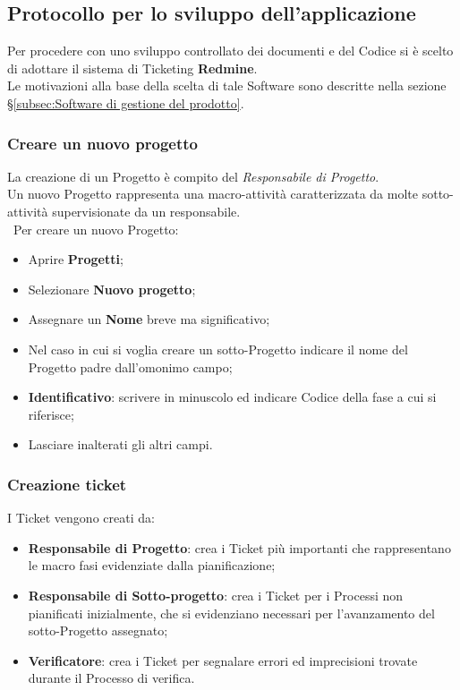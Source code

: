 \subsection{Protocollo per lo sviluppo dell'applicazione}
\label{sec:protocolloSviluppo} 
Per procedere con uno sviluppo controllato dei documenti e del Codice si è scelto di adottare il sistema di Ticketing \textbf{Redmine}.\\ 
Le motivazioni alla base della scelta di tale Software sono descritte nella sezione \S\ref{subsec:Software di gestione del prodotto}.

\subsubsection{Creare un nuovo progetto} 

La creazione di un Progetto è compito del \emph{Responsabile di Progetto}.\\ 
Un nuovo Progetto rappresenta una macro-attività caratterizzata da molte sotto-attività supervisionate da un responsabile.\\\
Per creare un nuovo Progetto:
\begin{itemize}
\item Aprire \textbf{Progetti}; 
\item Selezionare \textbf{Nuovo progetto}; 
\item Assegnare un \textbf{Nome} breve ma significativo; 
\item Nel caso in cui si voglia creare un sotto-Progetto indicare il nome del Progetto padre dall’omonimo campo; 
\item \textbf{Identificativo}: scrivere in minuscolo ed indicare Codice\ped{g} della fase a cui si riferisce;
\item Lasciare inalterati gli altri campi. 
\end{itemize}
 
\subsubsection{Creazione ticket}
 
  I Ticket vengono creati da:
 \begin{itemize}
 

    \item \textbf{Responsabile di Progetto}: crea i Ticket più importanti che rappresentano le macro fasi evidenziate dalla pianificazione; 
	\item \textbf{Responsabile di Sotto-progetto}: crea i Ticket per i Processi non pianificati inizialmente, che si evidenziano necessari per l’avanzamento del sotto-Progetto\ped{g} assegnato; 
	\item \textbf{Verificatore}: crea i Ticket\ped{g} per segnalare errori ed imprecisioni trovate durante il Processo\ped{g} di verifica. 
 \end{itemize}


